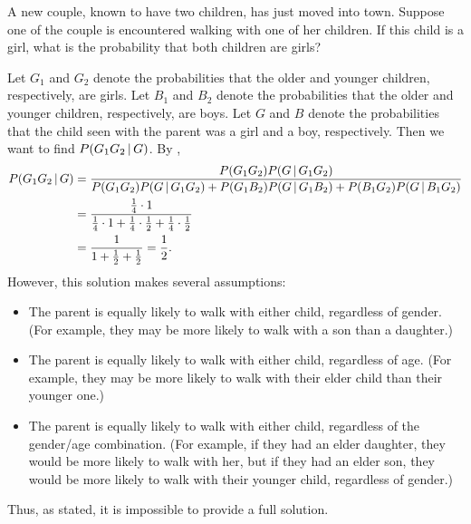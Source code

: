 \begin{changebar}
    \begin{example}
        A new couple, known to have two children, has just moved into town. Suppose one of the couple is encountered walking with one of her children. If this child is a girl, what is the probability that both children are girls?
    \end{example}
    \begin{solution}
        Let $G_1$ and $G_2$ denote the probabilities that the older and younger children, respectively, are girls. Let $B_1$ and $B_2$ denote the probabilities that the older and younger children, respectively, are boys. Let $G$ and $B$ denote the probabilities that the child seen with the parent was a girl and a boy, respectively. Then we want to find $P(G_1G_2 \,\vert\, G)$. By , \[
            \begin{aligned}
                P(G_1G_2 \,\vert\, G) &= \frac{P(G_1G_2)P(G \,\vert\, G_1G_2)}{P(G_1G_2)P(G \,\vert\, G_1G_2) + P(G_1B_2)P(G \,\vert\, G_1B_2) + P(B_1G_2)P(G \,\vert\, B_1G_2)} \\
                &= \frac{\frac{1}{4}\cdot 1}{\frac{1}{4}\cdot 1 + \frac{1}{4}\cdot\frac{1}{2} + \frac{1}{4}\cdot\frac{1}{2}} \\
                &= \frac{1}{1+\frac{1}{2}+\frac{1}{2}} = \frac{1}{2}.
            \end{aligned}    
        \] However, this solution makes several assumptions: \begin{itemize}
            \item The parent is equally likely to walk with either child, regardless of gender. (For example, they may be more likely to walk with a son than a daughter.)
            \item The parent is equally likely to walk with either child, regardless of age. (For example, they may be more likely to walk with their elder child than their younger one.)
            \item The parent is equally likely to walk with either child, regardless of the gender/age combination. (For example, if they had an elder daughter, they would be more likely to walk with her, but if they had an elder son, they would be more likely to walk with their younger child, regardless of gender.)
        \end{itemize}
        Thus, as stated, it is impossible to provide a full solution.
    \end{solution}
\end{changebar}
\pagebreak
